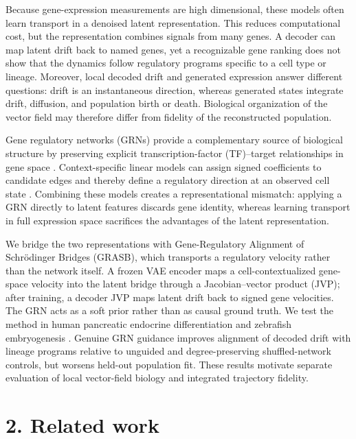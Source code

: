 \documentclass[
  11pt,
  letterpaper,
]{article}
\begin{document}
Because gene-expression measurements are high dimensional, these models
often learn transport in a denoised latent representation. This reduces
computational cost, but the representation combines signals from many
genes. A decoder can map latent drift back to named genes, yet a recognizable
gene ranking does not show that the dynamics follow regulatory programs
specific to a cell type or lineage. Moreover, local decoded drift and
generated expression answer different questions: drift is an
instantaneous direction, whereas generated states integrate drift,
diffusion, and population birth or death. Biological organization of the
vector field may therefore differ from fidelity of the reconstructed
population.

Gene regulatory networks (GRNs) provide a complementary source of
biological structure by preserving explicit transcription-factor
(TF)--target relationships in gene space \parencite{aibar_scenic_2017}.
Context-specific linear models can assign signed coefficients to
candidate edges and thereby define a
regulatory direction at an observed cell state \parencite{kamimoto_dissecting_2023}.
Combining these models creates a representational mismatch: applying a
GRN directly to latent features discards gene identity, whereas learning
transport in full expression space sacrifices the advantages of the
latent representation.

We bridge the two representations with Gene-Regulatory Alignment of
Schrödinger Bridges (GRASB), which transports a regulatory velocity
rather than the network itself. A frozen VAE encoder maps a
cell-contextualized gene-space velocity into the latent bridge through a
Jacobian--vector product (JVP); after training, a decoder JVP maps latent
drift back to signed gene velocities. The GRN acts as a soft prior rather
than as causal ground truth. We test the method in human pancreatic endocrine
differentiation and zebrafish embryogenesis
\parencite{veres_charting_2019,farrell_single-cell_2018}. Genuine GRN guidance improves alignment of decoded
drift with lineage programs relative to unguided and degree-preserving
shuffled-network controls, but worsens held-out population fit. These
results motivate separate evaluation of local vector-field biology and
integrated trajectory fidelity.

\section{2. Related work}\label{related-work}
\end{document}
